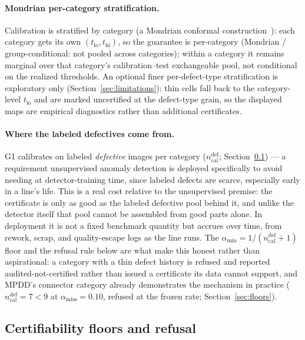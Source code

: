 \documentclass[preprint,11pt]{elsarticle}
\begin{document}
\paragraph{Mondrian per-category stratification.} Calibration is stratified by category (a Mondrian
conformal construction~\citep{vovk2005algorithmic}): each category gets its own $(t_{\text{lo}}, t_{\text{hi}})$, so the
guarantee is per-category (Mondrian / group-conditional: not pooled across categories); within a
category it remains marginal over that category's calibration--test exchangeable pool, not
conditional on the realized thresholds. An optional finer per-defect-type stratification is
exploratory only (Section~\ref{sec:limitations}): thin cells fall back to the category-level
$t_{\text{lo}}$ and are marked uncertified at the defect-type grain, so the displayed maps are
empirical diagnostics rather than additional certificates.

\paragraph{Where the labeled defectives come from.} G1 calibrates on labeled \emph{defective}
images per category ($n_{\text{cal}}^{\text{def}}$; Section~\ref{sec:floor}) --- a requirement
unsupervised anomaly detection is deployed specifically to avoid needing at detector-training
time, since labeled defects are scarce, especially early in a line's life. This is a real cost
relative to the unsupervised premise: the certificate is only as good as the labeled defective
pool behind it, and unlike the detector itself that pool cannot be assembled from good parts
alone. In deployment it is not a fixed benchmark quantity but accrues over time, from rework,
scrap, and quality-escape logs as the line runs. The $\alpha_{\min}=1/(n_{\text{cal}}^{\text{def}}+1)$
floor and the refusal rule below are what make this honest rather than aspirational: a category
with a thin defect history is refused and reported audited-not-certified rather than issued a
certificate its data cannot support, and MPDD's connector category already demonstrates the
mechanism in practice ($n_{\text{cal}}^{\text{def}}=7 < 9$ at $\alpha_{\text{miss}}=0.10$, refused
at the frozen rate; Section~\ref{sec:floors}).

\subsection{Certifiability floors and refusal}
\label{sec:floor}
\end{document}
